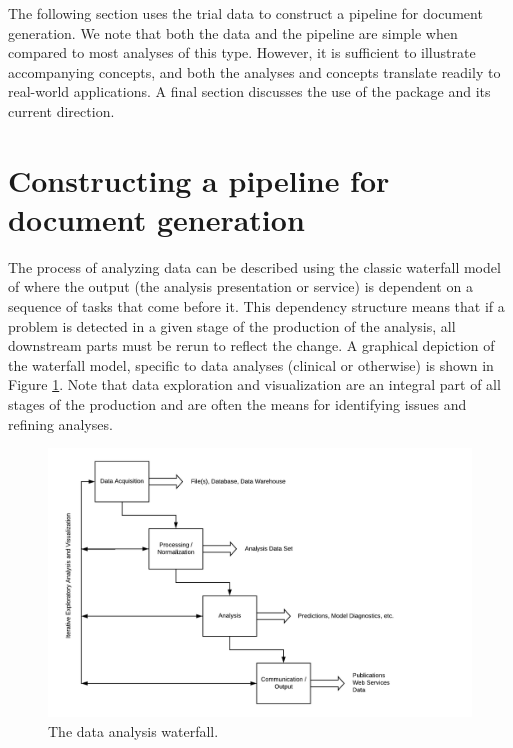 \noindent The following section uses the trial data to construct a
pipeline for document generation. We note that both the data and the
pipeline are simple when compared to most analyses of this type.
However, it is sufficient to illustrate accompanying concepts, and both
the analyses and concepts translate readily to real-world applications.
A final section discusses the use of the package and its current
direction.

\hypertarget{constructing-a-pipeline-for-document-generation}{%
\section{Constructing a pipeline for document
generation}\label{constructing-a-pipeline-for-document-generation}}

The process of analyzing data can be described using the classic
waterfall model of \citet{benington1983} where the output (the analysis
presentation or service) is dependent on a sequence of tasks that come
before it. This dependency structure means that if a problem is detected
in a given stage of the production of the analysis, all downstream parts
must be rerun to reflect the change. A graphical depiction of the
waterfall model, specific to data analyses (clinical or otherwise) is
shown in Figure \ref{fig:waterfall}. Note that data exploration and
visualization are an integral part of all stages of the production and
are often the means for identifying issues and refining analyses.

\begin{Schunk}
\begin{figure}[htbp]

{\centering \includegraphics[width=5in]{waterfall} 

}

\caption[The data analysis waterfall]{The data analysis waterfall.}\label{fig:waterfall}
\end{figure}
\end{Schunk}

